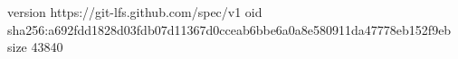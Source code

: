 version https://git-lfs.github.com/spec/v1
oid sha256:a692fdd1828d03fdb07d11367d0cceab6bbe6a0a8e580911da47778eb152f9eb
size 43840
